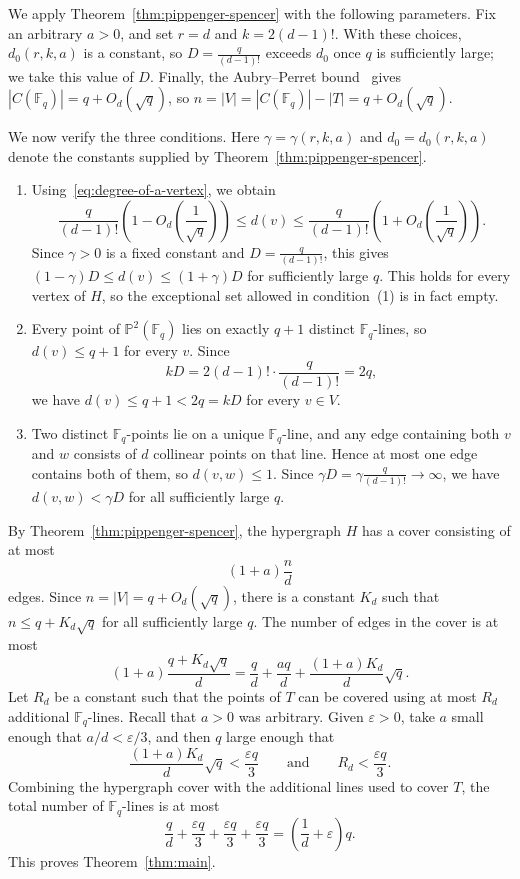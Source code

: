 \documentclass[12pt,reqno]{amsart}
\theoremstyle{definition}
\theoremstyle{remark}
\newcommand{\Fq}{\mathbb{F}_q}
\newcommand{\bP}{\mathbb{P}}
\begin{document}
We apply Theorem~\ref{thm:pippenger-spencer} with the following parameters. Fix an arbitrary $a>0$, and set $r=d$ and $k=2(d-1)!$. With these choices, $d_0(r,k,a)$ is a constant, so $D=\frac{q}{(d-1)!}$ exceeds $d_0$ once $q$ is sufficiently large; we take this value of $D$. Finally, the Aubry--Perret bound~\cite{AP96} gives $|C(\Fq)|=q+O_d(\sqrt q)$, so $n=|V|=|C(\Fq)|-|T|=q+O_d(\sqrt q)$.

We now verify the three conditions. Here $\gamma=\gamma(r,k,a)$ and $d_0=d_0(r,k,a)$ denote the constants supplied by Theorem~\ref{thm:pippenger-spencer}.
\begin{enumerate}
    \item Using~\eqref{eq:degree-of-a-vertex}, we obtain
    \[
    \frac{q}{(d-1)!}\left(1-O_d\left(\frac{1}{\sqrt{q}}\right)\right)
    \leq d(v)\leq
    \frac{q}{(d-1)!}\left(1+O_d\left(\frac{1}{\sqrt{q}}\right)\right).
    \]
    Since $\gamma>0$ is a fixed constant and $D=\frac{q}{(d-1)!}$, this gives $(1-\gamma)D\leq d(v)\leq(1+\gamma)D$ for sufficiently large $q$. This holds for every vertex of $H$, so the exceptional set allowed in condition~(1) is in fact empty.
    \item Every point of $\bP^2(\Fq)$ lies on exactly $q+1$ distinct $\Fq$-lines, so $d(v)\leq q+1$ for every $v$. Since
    \[
    kD=2(d-1)!\cdot\frac{q}{(d-1)!}=2q,
    \]
    we have $d(v)\leq q+1<2q=kD$ for every $v\in V$.
    \item Two distinct $\Fq$-points lie on a unique $\Fq$-line, and any edge containing both $v$ and $w$ consists of $d$ collinear points on that line. Hence at most one edge contains both of them, so $d(v,w)\leq 1$. Since $\gamma D=\gamma\frac{q}{(d-1)!}\to\infty$, we have $d(v,w)<\gamma D$ for all sufficiently large $q$.
\end{enumerate}
By Theorem~\ref{thm:pippenger-spencer}, the hypergraph $H$ has a cover
consisting of at most
\[
(1+a)\frac{n}{d}
\]
edges. Since $n=|V|=q+O_d(\sqrt q)$, there is a constant $K_d$ such that $n\leq q+K_d\sqrt q$ for all sufficiently large $q$. The number of edges in the cover is at most
\[
(1+a)\frac{q+K_d\sqrt q}{d}
=
\frac{q}{d}+\frac{aq}{d}+\frac{(1+a)K_d}{d}\sqrt q.
\]
Let $R_d$ be a constant such that the points of $T$ can be covered using at most $R_d$ additional $\Fq$-lines. Recall that $a>0$ was arbitrary. Given $\varepsilon>0$, take $a$ small enough that $a/d<\varepsilon/3$, and then $q$ large enough that
\[
\frac{(1+a)K_d}{d}\sqrt q<\frac{\varepsilon q}{3}
\qquad\text{and}\qquad
R_d<\frac{\varepsilon q}{3}.
\]
Combining the hypergraph cover with the additional lines used to cover $T$, the total number of $\Fq$-lines is at most
\[
\frac{q}{d}+\frac{\varepsilon q}{3}+\frac{\varepsilon q}{3}+\frac{\varepsilon q}{3}
=
\left(\frac{1}{d}+\varepsilon\right)q.
\]
This proves Theorem~\ref{thm:main}.
\end{document}
